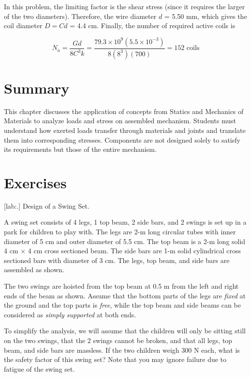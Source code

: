 \documentclass[a4paper,openany,12pt]{book}
\begin{document}
{{\begin{enumerate}
In this problem, the limiting factor is the shear stress (since it
requires the larger of the two diameters). Therefore, the wire diameter
\(d\) = 5.50 mm, which gives the coil diameter \(D = Cd\) = 4.4 cm. Finally,
the number of required active coils is

$$N_a = \frac{Gd}{8C^3k} = \frac{79.3 \times 10^9(5.5 \times 10^{-3})}{8(8^3)(700)} = 152\text{ coils}$$
\end{enumerate}

\section{Summary}
\label{sec:org6110f30}
This chapter discusses the application of concepts from Statics and
Mechanics of Materials to analyze loads and stress on assembled
mechanism. Students must understand how exerted loads transfer through
materials and joints and translate them into corresponding stresses.
Components are not designed solely to satisfy its requirements but those
of the entire mechanism.

\section{Exercises}
\label{sec:org1648265}
[lab:.] Design of a Swing Set.

A swing set consists of 4 legs, 1 top beam, 2 side bars, and 2 swings is
set up in a park for children to play with. The legs are 2-m long
circular tubes with inner diameter of 5 cm and outer diameter of 5.5 cm.
The top beam is a 2-m long solid 4 cm \(\times\) 4 cm cross sectioned
beam. The side bars are 1-m solid cylindrical cross sectioned bars with
diameter of 3 cm. The legs, top beam, and side bars are assembled as
shown.

The two swings are hoisted from the top beam at 0.5 m from the left and
right ends of the beam as shown. Assume that the bottom parts of the
legs are \emph{fixed} at the ground and the top parts is \emph{free}, while the
top beam and side beams can be considered as \emph{simply supported} at both
ends.

To simplify the analysis, we will assume that the children will only be
sitting still on the two swings, that the 2 swings cannot be broken, and
that all legs, top beam, and side bars are massless. If the two children
weigh 300 N each, what is the safety factor of this swing set? Note that
you may ignore failure due to fatigue of the swing set.

}}
\end{document}
